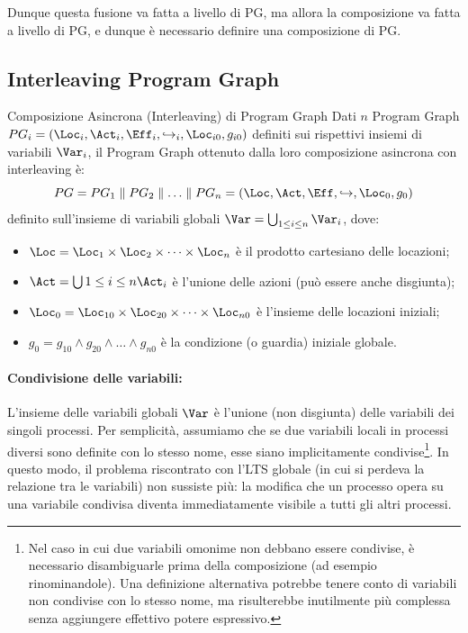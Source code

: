 Dunque questa fusione va fatta a livello di PG, ma allora la composizione va fatta a livello di PG, e dunque è necessario definire una composizione di PG\@.

\subsection{Interleaving Program Graph}

\begin{definition}{Composizione Asincrona (Interleaving) di Program Graph}
  Dati \(n\) Program Graph \(PG_i = (\Loc_i, \Act_i, \Eff_i, \hookrightarrow_i, \Loc_{i0}, g_{i0})\) definiti sui rispettivi insiemi di variabili \(\Var_i\), il Program Graph ottenuto dalla loro composizione asincrona con interleaving è:
  \[ PG = PG_1 \parallel PG_2 \parallel \ldots \parallel PG_n = (\Loc, \Act, \Eff, \hookrightarrow, \Loc_0, g_0) \]
  definito sull'insieme di variabili globali \(\Var = \bigcup_{1 \leq i \leq n} \Var_i\), dove:
  \begin{itemize}
    \item \(\Loc = \Loc_1 \times \Loc_2 \times \cdots \times \Loc_n\) è il prodotto cartesiano delle locazioni;
    \item \(\Act = \bigcup{1 \leq i \leq n} \Act_i\) è l'unione delle azioni (può essere anche disgiunta);
    \item \(\Loc_0 = \Loc_{10} \times \Loc_{20} \times \cdots \times \Loc_{n0}\) è l'insieme delle locazioni iniziali;
    \item \(g_0 = g_{10} \land g_{20} \land \ldots \land g_{n0}\) è la condizione (o guardia) iniziale globale.
  \end{itemize}
\end{definition}

\paragraph{Condivisione delle variabili:}
L'insieme delle variabili globali \(\Var\) è l'unione (non disgiunta) delle variabili dei singoli processi. Per semplicità, assumiamo che se due variabili locali in processi diversi sono definite con lo stesso nome, esse siano implicitamente condivise\footnote{Nel caso in cui due variabili omonime non debbano essere condivise, è necessario disambiguarle prima della composizione (ad esempio rinominandole). Una definizione alternativa potrebbe tenere conto di variabili non condivise con lo stesso nome, ma risulterebbe inutilmente più complessa senza aggiungere effettivo potere espressivo.}.
In questo modo, il problema riscontrato con l'LTS globale (in cui si perdeva la relazione tra le variabili) non sussiste più: la modifica che un processo opera su una variabile condivisa diventa immediatamente visibile a tutti gli altri processi.

